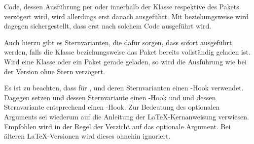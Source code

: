 Code,%
dessen Ausführung per  oder
 innerhalb der Klasse
respektive des Pakets verzögert wird, wird allerdings erst danach
ausgeführt. Mit  beziehungsweise
 wird dagegen sichergestellt, dass
 erst nach solchem Code ausgeführt wird.

Auch%
hierzu gibt es Sternvarianten, die dafür sorgen, dass 
sofort ausgeführt werden, falls die Klasse beziehungsweise das Paket bereits
vollständig geladen ist. Wird eine Klasse oder ein Paket gerade geladen, so
wird die Ausführung wie bei der Version ohne Stern verzögert.

Es ist zu beachten, dass  für ,
 und deren Sternvarianten einen -Hook
verwendet. Dagegen setzen  und dessen Sternvariante
einen -Hook und  und dessen
Sternvariante entsprechend einen -Hook. Zur Bedeutung
des optionalen Arguments  sei wiederum auf die Anleitung der
\LaTeX-Kernanweisung 
verwiesen. Empfohlen wird in der Regel der Verzicht auf das optionale
Argument. Bei älteren \LaTeX-Versionen wird dieses ohnehin ignoriert.

